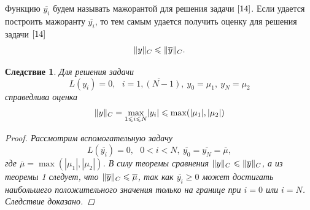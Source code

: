 \documentclass[11pt,a4paper,twoside]{report}
\numberwithin{equation}{section}
\theoremstyle{definition}
\theoremstyle{plain}
\newtheorem{cons}{Следствие}[section]
\DeclarePairedDelimiter\norm{\lVert}{\rVert}
\begin{document}
Функцию $\overline{y_i}$ будем называть мажорантой для решения задачи $\eqref{14}$.
Если удается построить мажоранту $\overline{y_i}$, то тем самым удается получить
оценку для решения задачи $\eqref{14}$
%
$$
    \norm{y}_C \leqslant \norm{\overline{y}}_C.
$$
%
\begin{cons}
%
    Для решения задачи
    $$
        L(y_i)=0,~~~i=\overline{1,(N-1)},~y_0=\mu_1,~y_N=\mu_2
    $$
    справедлива оценка
    \begin{equation}
        \label{17}
        \norm{y}_C=\underset{1\leqslant i\leqslant N}\max |y_i|
        \leqslant \max(|\mu_1|, |\mu_2|)
    \end{equation}
    \begin{proof}
        Рассмотрим вспомогательную задачу
        $$
            L(\overline{y_i})=0,~~~0<i<N,~\overline{y_0}=\overline{y_N}=
            \overline{\mu},
        $$
        где $\overline{\mu} = \max(|\mu_1|, |\mu_2|)$. В силу теоремы сравнения
        $\norm{y}_C \leqslant \norm{\overline{y}}_C$, а из теоремы 1 следует,
        что $\norm{\overline{y}}_C \leqslant \overline{\mu}$, так как
        $\overline{y_i} \geqslant 0$ может достигать наибольшего положительного
        значения только на границе при $i=0$ или $i=N$. Следствие доказано.
    \end{proof}
%
\end{cons}
%
%
\end{document}
